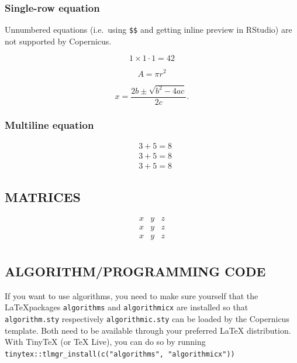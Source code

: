 \documentclass[gmd, manuscript]{copernicus}
\begin{document}
\subsubsection{Single-row equation}

Unnumbered equations (i.e.~using \texttt{\$\$} and getting inline
preview in RStudio) are not supported by Copernicus.

\begin{equation}
1 \times 1 \cdot 1 = 42
\end{equation}

\begin{equation}
A = \pi r^2
\end{equation}

\begin{equation}
x=\frac{2b\pm\sqrt{b^{2}-4ac}}{2c}.  
\end{equation}

\subsubsection{Multiline equation}

\begin{align}
& 3 + 5 = 8\\
& 3 + 5 = 8\\
& 3 + 5 = 8
\end{align}

\subsection{MATRICES}

\[
\begin{matrix}
x & y & z\\
x & y & z\\
x & y & z\\
\end{matrix}
\]

\subsection{ALGORITHM/PROGRAMMING CODE}

If you want to use algorithms, you need to make sure yourself that the
\LaTeX packages \texttt{algorithms} and \texttt{algorithmicx} are
installed so that \texttt{algorithm.sty} respectively
\texttt{algorithmic.sty} can be loaded by the Copernicus template. Both
need to be available through your preferred \LaTeX{} distribution. With
TinyTeX (or TeX Live), you can do so by running
\texttt{tinytex::tlmgr\_install(c("algorithms",\ "algorithmicx"))}
\end{document}
